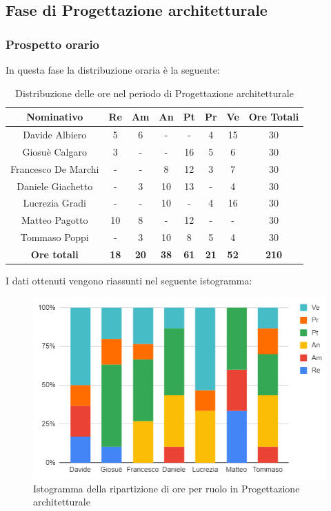 \subsection{Fase di Progettazione architetturale}
\subsubsection{Prospetto orario}
In questa fase la distribuzione oraria è la seguente:
\begin{table}[H]
		\begin{center}
			\setlength{\aboverulesep}{0pt}
			\setlength{\belowrulesep}{0pt}
			\setlength{\extrarowheight}{.75ex}
			\begin{tabular}{ c c c c c c c c }
				\rowcolor{AzzurroGruppo!30} 
				\textbf{Nominativo} & \textbf{Re} & \textbf{Am} & \textbf{An} & \textbf{Pt} & \textbf{Pr} & \textbf{Ve} & \textbf{Ore Totali}  \\
				\toprule
				Davide Albiero       & 5  & 6 & -  & -  & 4 & 15 & 30 \\
				Giosuè Calgaro      & 3  & - & -  & 16 & 5 & 6  & 30 \\
				Francesco De Marchi & -  & - & 8  & 12 & 3 & 7  & 30\\
				Daniele Giachetto  & -  & 3 & 10 & 13 & - & 4  & 30\\
				Lucrezia Gradi      & -  & - & 10 & -  & 4 & 16 & 30\\
				Matteo Pagotto      & 10 & 8 & -  & 12 & - & -  & 30\\
				Tommaso Poppi       & -  & 3 & 10 & 8  & 5 & 4  & 30\\
				 \textbf{Ore totali} & \textbf{18} & \textbf{20} & \textbf{38} & \textbf{61} & \textbf{21} & \textbf{52} & \textbf{210} \\
				\bottomrule
			\end{tabular}
			\caption{Distribuzione delle ore nel periodo di  Progettazione architetturale}
		\end{center}
	\end{table}
I dati ottenuti vengono riassunti nel seguente istogramma:
\begin{figure}[H]
    \centering
    \includegraphics[scale = 0.5]{components/img/architettura_isto.png}
    \caption{Istogramma della ripartizione di ore per ruolo in Progettazione architetturale}
    \label{fig:istogramma ripartizione ore , fase di Progettazione architetturale}
\end{figure}
